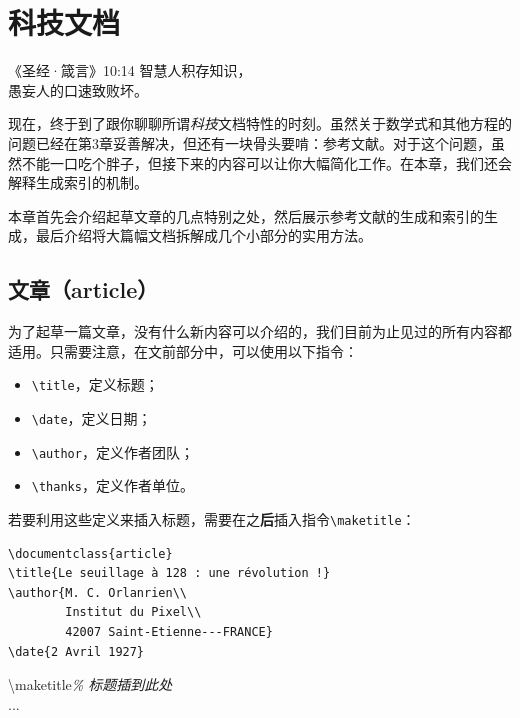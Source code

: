 \chapter{科技文档}

\begin{epigraphe}{《圣经·箴言》10:14}
    智慧人积存知识，\\愚妄人的口速致败坏。
\end{epigraphe}

现在，终于到了跟你聊聊所谓\emph{科技}文档特性的时刻。虽然关于数学式和其他方程的问题已经在第3章妥善解决，但还有一块骨头要啃：参考文献。对于这个问题，虽然不能一口吃个胖子，但接下来的内容可以让你大幅简化工作。在本章，我们还会解释生成索引的机制。

本章首先会介绍起草文章的几点特别之处，然后展示参考文献的生成和索引的生成，最后介绍将大篇幅文档拆解成几个小部分的实用方法。

\section{文章（article）}

为了起草一篇文章，没有什么新内容可以介绍的，我们目前为止见过的所有内容都适用。只需要注意，在文前部分中，可以使用以下指令：

\begin{itemize}
    \item \verb|\title|，定义标题；
    \item \verb|\date|，定义日期；
    \item \verb|\author|，定义作者团队；
    \item \verb|\thanks|，定义作者单位。
\end{itemize}

若要利用这些定义来插入标题，需要在\verb||之\textbf{后}插入指令\verb|\maketitle|：

\begin{dmd}
\begin{verbatim}
\documentclass{article}
\title{Le seuillage à 128 : une révolution !}
\author{M. C. Orlanrien\\
        Institut du Pixel\\
        42007 Saint-Etienne---FRANCE}
\date{2 Avril 1927}
\end{verbatim}
\backslash maketitle\textsl{\% 标题插到此处}\\
...\\
\verb||
\end{dmd}

